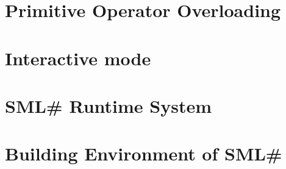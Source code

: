 \documentclass{jbook}
\newcommand{\txt}[2]{#2}
\newcommand{\smlsharp}{SML\#}
\begin{document}
\chapter{\txt
{オーバーロード演算子の処理}
{Primitive Operator Overloading}
}
\label{chap:primitiveoverloading}

\chapter{\txt
{対話型環境}
{Interactive mode}
}
\label{chap:interactivemode}

\chapter{\txt
{\smlsharp{}の実行時処理系}
{\smlsharp{} Runtime System }
}
\label{chap:runtimesystem}

\chapter{\txt
{\smlsharp{}のビルド環境}
{Building Environment of \smlsharp{}}
}
\label{chap:buildsystem}

\fi

% 
\end{document}
